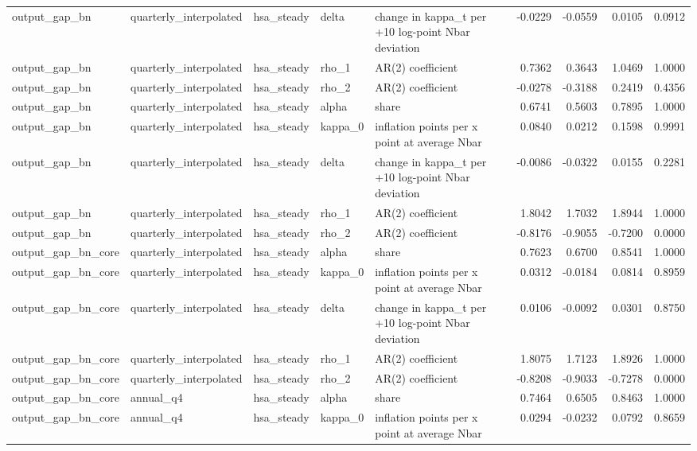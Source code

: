 \begin{tabular}{lllllrrrr}
output\_gap\_bn & quarterly\_interpolated & hsa\_steady & delta & change in kappa\_t per +10 log-point Nbar deviation & -0.0229 & -0.0559 & 0.0105 & 0.0912 \\
output\_gap\_bn & quarterly\_interpolated & hsa\_steady & rho\_1 & AR(2) coefficient & 0.7362 & 0.3643 & 1.0469 & 1.0000 \\
output\_gap\_bn & quarterly\_interpolated & hsa\_steady & rho\_2 & AR(2) coefficient & -0.0278 & -0.3188 & 0.2419 & 0.4356 \\
output\_gap\_bn & quarterly\_interpolated & hsa\_steady & alpha & share & 0.6741 & 0.5603 & 0.7895 & 1.0000 \\
output\_gap\_bn & quarterly\_interpolated & hsa\_steady & kappa\_0 & inflation points per x point at average Nbar & 0.0840 & 0.0212 & 0.1598 & 0.9991 \\
output\_gap\_bn & quarterly\_interpolated & hsa\_steady & delta & change in kappa\_t per +10 log-point Nbar deviation & -0.0086 & -0.0322 & 0.0155 & 0.2281 \\
output\_gap\_bn & quarterly\_interpolated & hsa\_steady & rho\_1 & AR(2) coefficient & 1.8042 & 1.7032 & 1.8944 & 1.0000 \\
output\_gap\_bn & quarterly\_interpolated & hsa\_steady & rho\_2 & AR(2) coefficient & -0.8176 & -0.9055 & -0.7200 & 0.0000 \\
output\_gap\_bn\_core & quarterly\_interpolated & hsa\_steady & alpha & share & 0.7623 & 0.6700 & 0.8541 & 1.0000 \\
output\_gap\_bn\_core & quarterly\_interpolated & hsa\_steady & kappa\_0 & inflation points per x point at average Nbar & 0.0312 & -0.0184 & 0.0814 & 0.8959 \\
output\_gap\_bn\_core & quarterly\_interpolated & hsa\_steady & delta & change in kappa\_t per +10 log-point Nbar deviation & 0.0106 & -0.0092 & 0.0301 & 0.8750 \\
output\_gap\_bn\_core & quarterly\_interpolated & hsa\_steady & rho\_1 & AR(2) coefficient & 1.8075 & 1.7123 & 1.8926 & 1.0000 \\
output\_gap\_bn\_core & quarterly\_interpolated & hsa\_steady & rho\_2 & AR(2) coefficient & -0.8208 & -0.9033 & -0.7278 & 0.0000 \\
output\_gap\_bn\_core & annual\_q4 & hsa\_steady & alpha & share & 0.7464 & 0.6505 & 0.8463 & 1.0000 \\
output\_gap\_bn\_core & annual\_q4 & hsa\_steady & kappa\_0 & inflation points per x point at average Nbar & 0.0294 & -0.0232 & 0.0792 & 0.8659 \\

\end{tabular}
